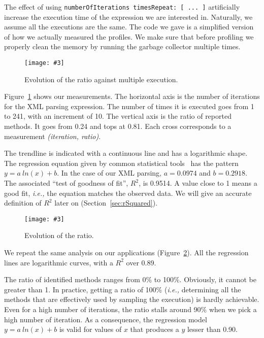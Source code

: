 \documentclass{sig-alternate}
\newcommand{\ct}{\lstinline[backgroundcolor=\color{white},basicstyle=\footnotesize\ttfamily]}
\newcommand{\fig}[4]{
	\begin{figure}[#1]
		\centering
		\texttt{[image: \#3]}
		\caption{\label{fig:#3}#4}
	\end{figure}}
\newcommand{\ie}{\emph{i.e.,}\xspace}
\newcommand{\secref}[1]{Section~\ref{sec:#1}}
\newcommand{\figref}[1]{Figure~\ref{fig:#1}}
\begin{document}
The effect of using \ct{numberOfIterations timesRepeat: [ ... ]} artificially increase the execution time of the expression we are interested in. Naturally, we assume all the executions are the same. The code we gave is a simplified version of how we actually measured the profiles. We make sure that before profiling we properly clean the memory by running the garbage collector multiple times.

%

\fig{h}{0.5}{IterationEvolution}{Evolution of the ratio against multiple execution.}

\figref{IterationEvolution} shows our measurements. The horizontal axis is the number of iterations for the XML parsing expression. The number of times it is executed goes from 1 to 241, with an increment of 10. The vertical axis is the ratio of reported methods. It goes from 0.24 and tops at 0.81. Each cross corresponds to a measurement \textit{(iteration, ratio)}.

The trendline is indicated with a continuous line and has a logarithmic shape. The regression equation given by common statistical tools~\cite{Free97a} has the pattern $y = a~ln(x) + b$. In the case of our XML parsing, $a = 0.0974$ and $b = 0.2918$. The associated ``test of goodness of fit'', $R^2$, is 0.9514. A value close to 1 means a good fit, \ie the equation matches the observed data. We will give an accurate definition of $R^2$ later on (\secref{rSquared}).

\fig{h}{0.5}{IterationEvolutionForApplications}{Evolution of the ratio.}
We repeat the same analysis on our applications (\figref{IterationEvolutionForApplications}). All the regression lines are logarithmic curves, with a $R^2$ over 0.89. 

The ratio of identified methods ranges from 0\% to 100\%. Obviously, it cannot be greater than 1. In practice, getting a ratio of 100\% (\ie determining all the methods that are effectively used by sampling the execution) is hardly achievable. Even for a high number of iterations, the ratio stalls around 90\% when we pick a high number of iteration. As a consequence, the regression model $y = a~ln(x) + b$ is valid for values of $x$ that produces a $y$ lesser than 0.90. 
\end{document}
